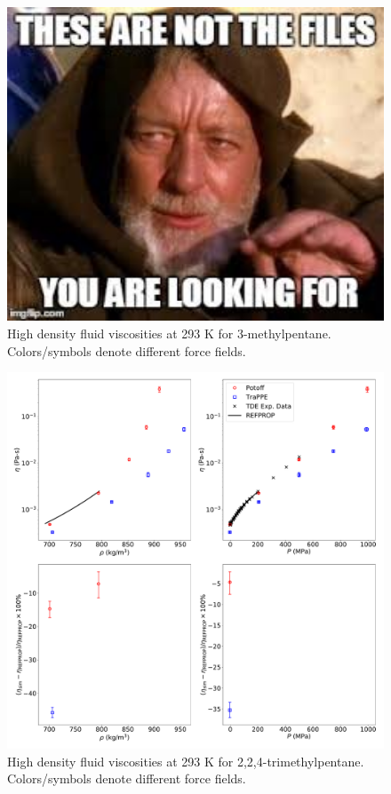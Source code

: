\documentclass[preprint,review,12pt]{elsarticle}
\begin{document}
	\begin{figure}[p!]
		\centering
		\includegraphics[width=6.4in]{empty_figure.jpg}
		\caption{High density fluid viscosities at 293 K for 3-methylpentane. Colors/symbols denote different force fields.}
		\label{fig:T293highP_3MP}
	\end{figure} 
	
	\begin{figure}[p!]
		\centering
		\includegraphics[width=6.4in]{compare_REFPROP_T293highP_IC8H18.pdf}
		\caption{High density fluid viscosities at 293 K for 2,2,4-trimethylpentane. Colors/symbols denote different force fields.}
		\label{fig:T293highP_IC8}
	\end{figure} 
	
\end{document}
